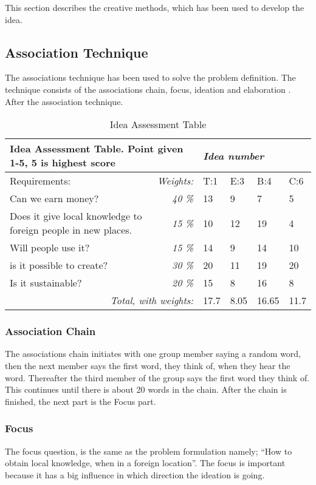 This section describes the creative methods, which has been used to develop the idea.
\subsection{Association Technique}
The associations technique has been used to solve the problem definition. The technique consists of the associations chain, focus, ideation and elaboration . After the association technique. 

\begin{table*}[t!]
\centering
\caption{Idea Assessment Table}
\label{tab:iass}
\begin{tabular}{|l|r|l|l|l|l|}
\hline
\multicolumn{2}{|l|}{\textbf{Idea Assessment Table. Point given 1-5, 5 is highest score}} & \multicolumn{4}{l|}{\textit{Idea number}} \\ \hline
Requirements: & \multicolumn{1}{l|}{\textit{Weights:}} & T:1 & E:3 & B:4 & C:6 \\ \hline
Can we earn money? & \textit{40 \%} & 13 & 9 & 7 & 5 \\ \hline
Does it give local knowledge to foreign people in new places. & \textit{15 \%} & 10 & 12 & 19 & 4 \\ \hline
Will people use it? & \textit{15 \%} & 14 & 9 & 14 & 10 \\ \hline
is it possible to create? & \textit{30 \%} & 20 & 11 & 19 & 20 \\ \hline
Is it sustainable? & \textit{20 \%} & 15 & 8 & 16 & 8 \\ \hline
\multicolumn{2}{|r|}{\textit{Total, with weights:}} & \cellcolor[HTML]{9AFF99}17.7 & \cellcolor[HTML]{FD6864}8.05 & \cellcolor[HTML]{FFFC9E}16.65 & \cellcolor[HTML]{FD6864}11.7 \\ \hline
\end{tabular}
\end{table*}

\subsubsection{Association Chain}
The associations chain initiates with one group member saying a random word, then the next member says the first word, they think of, when they hear the word. Thereafter the third member of the group says the first word they think of. This continues until there is about 20 words in the chain. After the chain is finished, the next part is the Focus part.

\subsubsection{Focus}
The focus question, is the same as the problem formulation namely; “How to obtain local knowledge, when in a foreign location”. The focus is important because it has a big influence in which direction the ideation is going. 

